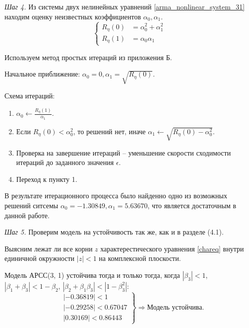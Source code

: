 \documentclass[12pt, fleqn]{article}
\begin{document}
{{{			\textit{Шаг 4.} Из системы двух нелинейных уравнений \eqref{arma_nonlinear_system_31} находим оценку неизвестных коэффициентов $\alpha_0, \alpha_1$.
			\begin{equation}\label{arma_nonlinear_system_31}
				\left\{
				\begin{split}
					R_{\eta}(0) &= \alpha_0^2 + \alpha_1^2 \\
					R_{\eta}(1) &= \alpha_0 \alpha_1
				\end{split}
				\right.
			\end{equation}
			
			Используем метод простых итераций из приложения Б.
			
			Начальное приближение: $\alpha_0 = 0, \alpha_1 = \sqrt{R_{\eta}(0)}$. \medskip
	  
			Схема итераций:
			\begin{enumerate}
					\item {$\alpha_0 \leftarrow \displaystyle\frac{R_{\eta}(1)}{\alpha_1}$.}
					\item {Если $R_{\eta}(0) < \alpha_0^2$, то решений нет, иначе $\alpha_1 \leftarrow \displaystyle\sqrt{R_{\eta}(0) - \alpha_0^2}$.}
					\item {Проверка на завершение итераций -- уменьшение скорости сходимости итераций до заданного значения $\epsilon$.}
					\item {Переход к пункту 1.}
			\end{enumerate}

			В результате итерационного процесса было найденно одно из возможных решений ситсемы $\alpha_0 =-1.30849, \alpha_1 =5.63670$, что является достаточным в данной работе.\medskip		  
			
			\textit{Шаг 5.} Проверим модель на устойчивость так же, как и в разделе (4.1).
			
			Выясним лежат ли все корни $z$ характерестического уравнения \eqref{chareq} внутри единичной окружности $ \left| z \right| < 1 $ на комплексной плоскости.
			
			Модель АРСС(3, 1) устойчива тогда и только тогда, когда $\left| \beta_3 \right| < 1$, $\left| \beta_1 + \beta_3 \right| < 1 - \beta_2$, $\left| \beta_2 + \beta_1 \beta_3 \right| < \left| 1 - \beta^2_3 \right|$:
				\begin{equation*}
					\left.
					\begin{split}
						&\left| -0.36819 \right| < 1 \\
						&\left| -0.29258 \right| < 0.67047 \\
						&\left| 0.30169 \right| < 0.86443
					\end{split}
					\right\} \Rightarrow \text{Модель устойчива}.
				\end{equation*}\medskip
				
}}}
\end{document}
